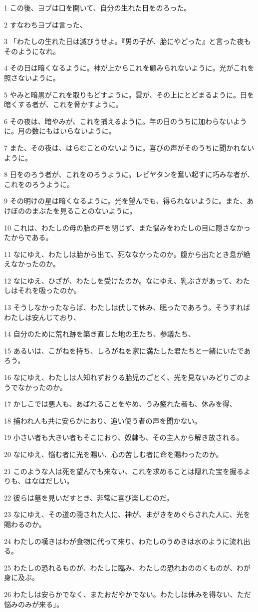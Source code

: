 \par 1 この後、ヨブは口を開いて、自分の生れた日をのろった。
\par 2 すなわちヨブは言った、
\par 3 「わたしの生れた日は滅びうせよ。『男の子が、胎にやどった』と言った夜もそのようになれ。
\par 4 その日は暗くなるように。神が上からこれを顧みられないように。光がこれを照さないように。
\par 5 やみと暗黒がこれを取りもどすように。雲が、その上にとどまるように。日を暗くする者が、これを脅かすように。
\par 6 その夜は、暗やみが、これを捕えるように。年の日のうちに加わらないように。月の数にもはいらないように。
\par 7 また、その夜は、はらむことのないように。喜びの声がそのうちに聞かれないように。
\par 8 日をのろう者が、これをのろうように。レビヤタンを奮い起すに巧みな者が、これをのろうように。
\par 9 その明けの星は暗くなるように。光を望んでも、得られないように。また、あけぼののまぶたを見ることのないように。
\par 10 これは、わたしの母の胎の戸を閉じず、また悩みをわたしの目に隠さなかったからである。
\par 11 なにゆえ、わたしは胎から出て、死ななかったのか。腹から出たとき息が絶えなかったのか。
\par 12 なにゆえ、ひざが、わたしを受けたのか。なにゆえ、乳ぶさがあって、わたしはそれを吸ったのか。
\par 13 そうしなかったならば、わたしは伏して休み、眠ったであろう。そうすればわたしは安んじており、
\par 14 自分のために荒れ跡を築き直した地の王たち、参議たち、
\par 15 あるいは、こがねを持ち、しろがねを家に満たした君たちと一緒にいたであろう。
\par 16 なにゆえ、わたしは人知れずおりる胎児のごとく、光を見ないみどりごのようでなかったのか。
\par 17 かしこでは悪人も、あばれることをやめ、うみ疲れた者も、休みを得、
\par 18 捕われ人も共に安らかにおり、追い使う者の声を聞かない。
\par 19 小さい者も大きい者もそこにおり、奴隷も、その主人から解き放される。
\par 20 なにゆえ、悩む者に光を賜い、心の苦しむ者に命を賜わったのか。
\par 21 このような人は死を望んでも来ない、これを求めることは隠れた宝を掘るよりも、はなはだしい。
\par 22 彼らは墓を見いだすとき、非常に喜び楽しむのだ。
\par 23 なにゆえ、その道の隠された人に、神が、まがきをめぐらされた人に、光を賜わるのか。
\par 24 わたしの嘆きはわが食物に代って来り、わたしのうめきは水のように流れ出る。
\par 25 わたしの恐れるものが、わたしに臨み、わたしの恐れおののくものが、わが身に及ぶ。
\par 26 わたしは安らかでなく、またおだやかでない。わたしは休みを得ない、ただ悩みのみが来る」。

